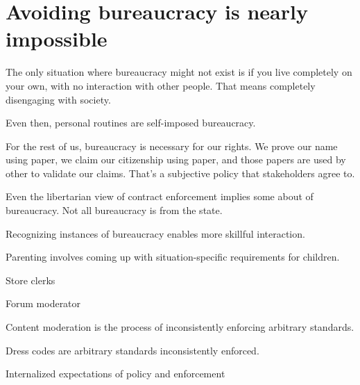 \section{Avoiding bureaucracy is nearly impossible}

The only situation where bureaucracy might not exist is if you live completely on your own, with no interaction with other people. That means completely disengaging with society. 

Even then, personal routines are self-imposed bureaucracy.


For the rest of us, bureaucracy is necessary for our rights. We prove our name using paper, we claim our citizenship using paper, and those papers are used by other to validate our claims. That's a subjective policy that stakeholders agree to. 

Even the libertarian view of contract enforcement implies some about of bureaucracy. Not all bureaucracy is from the state. 

Recognizing instances of bureaucracy enables more skillful interaction.


Parenting involves coming up with situation-specific requirements for children. 

Store clerks

Forum moderator

Content moderation is the process of inconsistently enforcing arbitrary standards. 

Dress codes are arbitrary standards inconsistently enforced. 


Internalized expectations of policy and enforcement